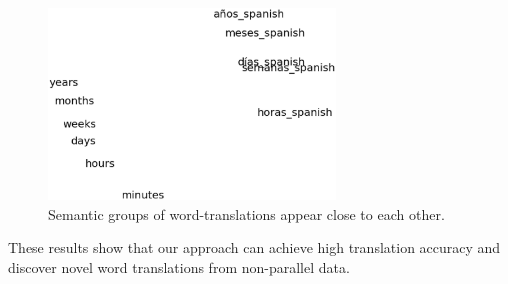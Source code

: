  \begin{figure}[!ht]
  \centering
  \includegraphics[width=3.0in,height=2.0in]{time}
  \caption{Semantic groups of word-translations appear close to each other.}
\label{fig:trans-cluster}
\end{figure}


These results show that our approach can achieve high translation accuracy and discover novel word translations from non-parallel data. 

